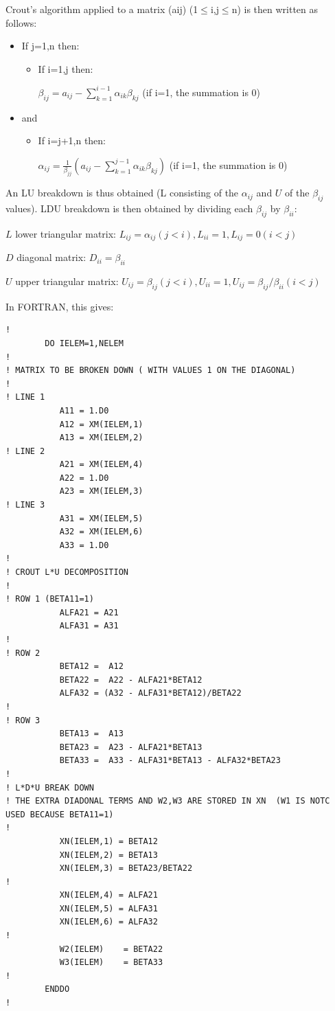 Crout's algorithm applied to a matrix (aij) (1$\mathrm{\le}$i,j$\mathrm{\le}$n)
is then written as follows:
\begin{itemize}
  \item If j=1,n then:

    \begin{itemize}
      \item If i=1,j then:

$\beta _{ij} =a_{ij} -\sum _{k=1}^{i-1}\alpha _{ik} \beta _{kj}  $ (if i=1, the
summation is 0)
\end{itemize}

\item and

  \begin{itemize}
    \item If i=j+1,n then:

$\alpha _{ij} =\frac{1}{\beta _{jj} } (a_{ij} -\sum _{k=1}^{j-1}\alpha _{ik}
\beta _{kj} ) $  (if i=1, the summation is 0)
\end{itemize}
\end{itemize}

An LU breakdown is thus obtained (L consisting of the $\alpha _{ij}$ and $U$ of
the $\beta _{ij}$ values). LDU breakdown is then obtained by dividing each
$\beta _{ij}$ by $\beta _{ii}$:

$L$ lower triangular matrix: $L_{ij} = \alpha _{ij} (j<i), L_{ii} = 1, L_{ij} = 0 (i<j)$

$D$ diagonal matrix: $D_{ii} = \beta _{ii}$

$U$ upper triangular matrix: $U_{ij} = \beta _{ij} (j<i), U_{ii} = 1, U_{ij} = \beta _{ij} / \beta _{ii} (i<j)$


In FORTRAN, this gives:
\begin{lstlisting}[language=TelFortran]
!
        DO IELEM=1,NELEM
!
! MATRIX TO BE BROKEN DOWN ( WITH VALUES 1 ON THE DIAGONAL)
!
! LINE 1
           A11 = 1.D0
           A12 = XM(IELEM,1)
           A13 = XM(IELEM,2)
! LINE 2
           A21 = XM(IELEM,4)
           A22 = 1.D0
           A23 = XM(IELEM,3)
! LINE 3
           A31 = XM(IELEM,5)
           A32 = XM(IELEM,6)
           A33 = 1.D0
!
! CROUT L*U DECOMPOSITION
!
! ROW 1 (BETA11=1)
           ALFA21 = A21
           ALFA31 = A31
!
! ROW 2
           BETA12 =  A12
           BETA22 =  A22 - ALFA21*BETA12
           ALFA32 = (A32 - ALFA31*BETA12)/BETA22
!
! ROW 3
           BETA13 =  A13
           BETA23 =  A23 - ALFA21*BETA13
           BETA33 =  A33 - ALFA31*BETA13 - ALFA32*BETA23
!
! L*D*U BREAK DOWN
! THE EXTRA DIADONAL TERMS AND W2,W3 ARE STORED IN XN  (W1 IS NOTC USED BECAUSE BETA11=1)
!
           XN(IELEM,1) = BETA12
           XN(IELEM,2) = BETA13
           XN(IELEM,3) = BETA23/BETA22
!
           XN(IELEM,4) = ALFA21
           XN(IELEM,5) = ALFA31
           XN(IELEM,6) = ALFA32
!
           W2(IELEM)    = BETA22
           W3(IELEM)    = BETA33
!
        ENDDO
!
\end{lstlisting}

